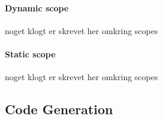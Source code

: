     \paragraph{Dynamic scope} noget klogt er skrevet her omkring scopes
    
    \paragraph{Static scope} noget klogt er skrevet her omkring scopes

    


\subsection{Code Generation}
